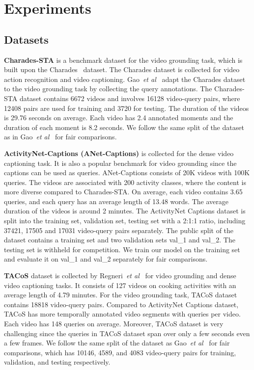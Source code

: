 \documentclass[10pt,twocolumn,letterpaper]{article}
\def\etal{\emph{et al}\onedot}
\begin{document}
			
	

	
	\section{Experiments}
	\subsection{Datasets}


	\noindent \textbf{Charades-STA} is a benchmark dataset for the video grounding task, which is built upon the Charades~\cite{sigurdsson2016hollywood} dataset. 
	The Charades dataset is collected for video action recognition and video captioning. 
    Gao~\etal~\cite{gao2017tall} adapt the Charades dataset to the video grounding task by collecting the query annotations. The Charades-STA dataset contains 6672 videos and involves 16128 video-query pairs, where 12408 pairs are used for training and 3720 for testing.  The duration of the videos is 29.76 seconds on average. Each video has 2.4 annotated moments and the duration of each moment is 8.2 seconds. We follow the same split of the dataset as in Gao~\etal~\cite{gao2017tall} for fair comparisons.
	
	\noindent \textbf{ActivityNet-Captions (ANet-Captions)} is collected for the dense video captioning task. It is also a popular benchmark for video grounding since the captions can be used as queries. ANet-Captions consists of 20K videos with 100K queries. 
	The videos are associated with 200 activity classes, where the content is more diverse compared to Charades-STA. 
On average, each video contains 3.65 queries, and each query has an average length of 13.48 words. The average duration of the videos is around 2 minutes. The ActivityNet Captions dataset is split into the training set, validation set, testing set with a 2:1:1 ratio, including 37421, 17505 and 17031 video-query pairs separately. The public split of the dataset contains a training set and two validation sets val\_1 and val\_2. The testing set is withheld for competition. We train our model on the training set and evaluate it on val\_1 and val\_2 separately for fair comparisons. 
	
	\noindent \textbf{TACoS} dataset is collected by Regneri~\etal~\cite{regneri2013grounding} for video grounding and dense video captioning tasks. It consists of 127 videos on cooking activities with an average length of 4.79 minutes. For the video grounding task, TACoS dataset contains 18818 video-query pairs. 
	Compared to ActivityNet Captions dataset, TACoS has more temporally annotated video segments with queries per video. 
	Each video has 148 queries on average. Moreover, TACoS dataset is very challenging since the queries in TACoS dataset span over only a few seconds even a few frames. We follow the same split of the dataset as Gao~\etal~\cite{gao2017tall} for fair comparisons, which has 10146, 4589, and 4083 video-query pairs for training, validation, and testing respectively.
	
\end{document}
